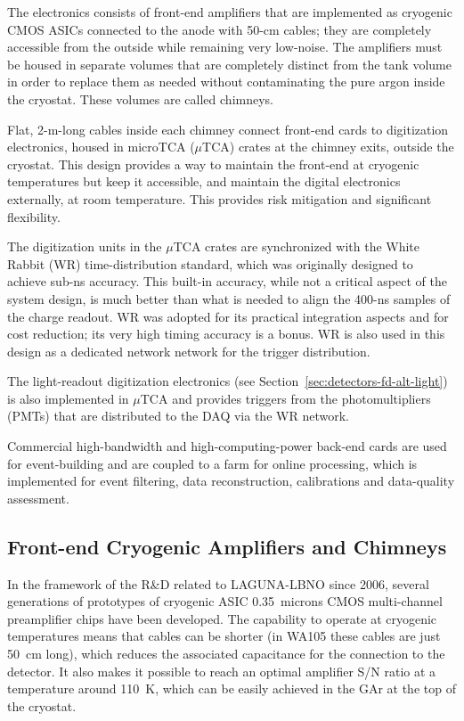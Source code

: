 The electronics consists of front-end amplifiers that are implemented as cryogenic CMOS ASICs
connected to the anode with 50-cm cables; they are completely
accessible from the outside while remaining very low-noise. The
amplifiers must be housed in separate volumes that
are completely distinct from the tank volume
in order to replace them as needed without
contaminating the pure argon inside the cryostat. These volumes are called chimneys.

Flat, 2-m-long cables inside each chimney connect front-end cards
to digitization electronics, housed in microTCA ($\mu$TCA)  crates \cite{mTCA-standard} at the chimney exits, outside the cryostat.
This design provides a way to maintain the front-end at cryogenic temperatures but keep
it accessible, and maintain the digital electronics externally, at room temperature.
 This provides risk mitigation and significant flexibility.

The digitization units in the $\mu$TCA
crates are synchronized with the White Rabbit (WR) time-distribution
standard\cite{WR-standard}, which was originally designed to achieve
sub-ns accuracy.
%
This built-in accuracy, while not a critical aspect of the system
design, is much better than what is needed to align the 400-ns samples
of the charge readout.  WR was adopted for its practical
integration aspects and for cost reduction; its very high timing accuracy is a
bonus.  WR is also used in this design as a dedicated network
network for the trigger distribution. 

The light-readout digitization
electronics (see Section~\ref{sec:detectors-fd-alt-light}) is also
implemented in $\mu$TCA and provides triggers from the
photomultipliers (PMTs) that are distributed to the DAQ via the WR
network. 

Commercial high-bandwidth and high-computing-power back-end
cards are used for event-building and are coupled to a farm for online
processing, which is implemented for event filtering, data
reconstruction, calibrations and data-quality assessment.


\subsection{Front-end Cryogenic Amplifiers and Chimneys}

In the framework of the R\&D related to LAGUNA-LBNO since 2006,
several generations of prototypes of cryogenic ASIC 0.35~microns CMOS
multi-channel preamplifier chips have been developed. 
The capability to operate at cryogenic temperatures means that cables can be shorter 
(in WA105 these cables are just 50~cm long), which reduces the associated 
capacitance for the connection to the detector. It also makes it possible to reach
 an optimal amplifier S/N ratio at a
temperature around 110~K, which can be easily achieved in the GAr at
the top of the cryostat. 


